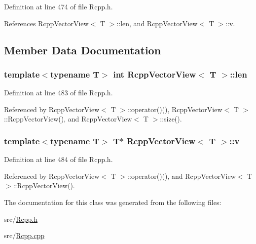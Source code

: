 Definition at line 474 of file Rcpp.h.

References RcppVectorView$<$ T $>$::len, and RcppVectorView$<$ T $>$::v.

\subsection{Member Data Documentation}
\hypertarget{classRcppVectorView_da67f9b1481099e4a820deaf4648778b}{
\subsubsection[len]{\setlength{\rightskip}{0pt plus 5cm}template$<$typename T$>$ int {\bf RcppVectorView}$<$ T $>$::{\bf len}}}
\label{classRcppVectorView_da67f9b1481099e4a820deaf4648778b}




Definition at line 483 of file Rcpp.h.

Referenced by RcppVectorView$<$ T $>$::operator()(), RcppVectorView$<$ T $>$::RcppVectorView(), and RcppVectorView$<$ T $>$::size().\hypertarget{classRcppVectorView_e3dc3546d0dd0e3de95800b7c91857e8}{
\subsubsection[v]{\setlength{\rightskip}{0pt plus 5cm}template$<$typename T$>$ T$\ast$ {\bf RcppVectorView}$<$ T $>$::{\bf v}}}
\label{classRcppVectorView_e3dc3546d0dd0e3de95800b7c91857e8}




Definition at line 484 of file Rcpp.h.

Referenced by RcppVectorView$<$ T $>$::operator()(), and RcppVectorView$<$ T $>$::RcppVectorView().

The documentation for this class was generated from the following files:\begin{CompactItemize}
\item 
src/\hyperlink{Rcpp_8h}{Rcpp.h}\item 
src/\hyperlink{Rcpp_8cpp}{Rcpp.cpp}\end{CompactItemize}
